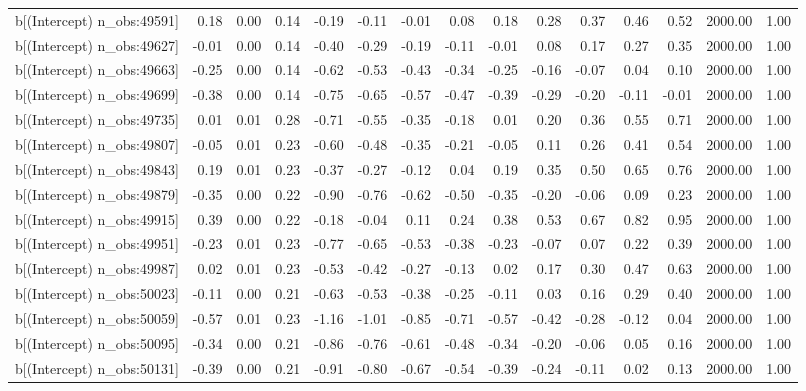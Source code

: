 \begin{table}[ht]
\begin{tabular}{rrrrrrrrrrrrrrr}
  b[(Intercept) n\_obs:49591] & 0.18 & 0.00 & 0.14 & -0.19 & -0.11 & -0.01 & 0.08 & 0.18 & 0.28 & 0.37 & 0.46 & 0.52 & 2000.00 & 1.00 \\ 
  b[(Intercept) n\_obs:49627] & -0.01 & 0.00 & 0.14 & -0.40 & -0.29 & -0.19 & -0.11 & -0.01 & 0.08 & 0.17 & 0.27 & 0.35 & 2000.00 & 1.00 \\ 
  b[(Intercept) n\_obs:49663] & -0.25 & 0.00 & 0.14 & -0.62 & -0.53 & -0.43 & -0.34 & -0.25 & -0.16 & -0.07 & 0.04 & 0.10 & 2000.00 & 1.00 \\ 
  b[(Intercept) n\_obs:49699] & -0.38 & 0.00 & 0.14 & -0.75 & -0.65 & -0.57 & -0.47 & -0.39 & -0.29 & -0.20 & -0.11 & -0.01 & 2000.00 & 1.00 \\ 
  b[(Intercept) n\_obs:49735] & 0.01 & 0.01 & 0.28 & -0.71 & -0.55 & -0.35 & -0.18 & 0.01 & 0.20 & 0.36 & 0.55 & 0.71 & 2000.00 & 1.00 \\ 
  b[(Intercept) n\_obs:49807] & -0.05 & 0.01 & 0.23 & -0.60 & -0.48 & -0.35 & -0.21 & -0.05 & 0.11 & 0.26 & 0.41 & 0.54 & 2000.00 & 1.00 \\ 
  b[(Intercept) n\_obs:49843] & 0.19 & 0.01 & 0.23 & -0.37 & -0.27 & -0.12 & 0.04 & 0.19 & 0.35 & 0.50 & 0.65 & 0.76 & 2000.00 & 1.00 \\ 
  b[(Intercept) n\_obs:49879] & -0.35 & 0.00 & 0.22 & -0.90 & -0.76 & -0.62 & -0.50 & -0.35 & -0.20 & -0.06 & 0.09 & 0.23 & 2000.00 & 1.00 \\ 
  b[(Intercept) n\_obs:49915] & 0.39 & 0.00 & 0.22 & -0.18 & -0.04 & 0.11 & 0.24 & 0.38 & 0.53 & 0.67 & 0.82 & 0.95 & 2000.00 & 1.00 \\ 
  b[(Intercept) n\_obs:49951] & -0.23 & 0.01 & 0.23 & -0.77 & -0.65 & -0.53 & -0.38 & -0.23 & -0.07 & 0.07 & 0.22 & 0.39 & 2000.00 & 1.00 \\ 
  b[(Intercept) n\_obs:49987] & 0.02 & 0.01 & 0.23 & -0.53 & -0.42 & -0.27 & -0.13 & 0.02 & 0.17 & 0.30 & 0.47 & 0.63 & 2000.00 & 1.00 \\ 
  b[(Intercept) n\_obs:50023] & -0.11 & 0.00 & 0.21 & -0.63 & -0.53 & -0.38 & -0.25 & -0.11 & 0.03 & 0.16 & 0.29 & 0.40 & 2000.00 & 1.00 \\ 
  b[(Intercept) n\_obs:50059] & -0.57 & 0.01 & 0.23 & -1.16 & -1.01 & -0.85 & -0.71 & -0.57 & -0.42 & -0.28 & -0.12 & 0.04 & 2000.00 & 1.00 \\ 
  b[(Intercept) n\_obs:50095] & -0.34 & 0.00 & 0.21 & -0.86 & -0.76 & -0.61 & -0.48 & -0.34 & -0.20 & -0.06 & 0.05 & 0.16 & 2000.00 & 1.00 \\ 
  b[(Intercept) n\_obs:50131] & -0.39 & 0.00 & 0.21 & -0.91 & -0.80 & -0.67 & -0.54 & -0.39 & -0.24 & -0.11 & 0.02 & 0.13 & 2000.00 & 1.00 \\ 

\end{tabular}
\end{table}
